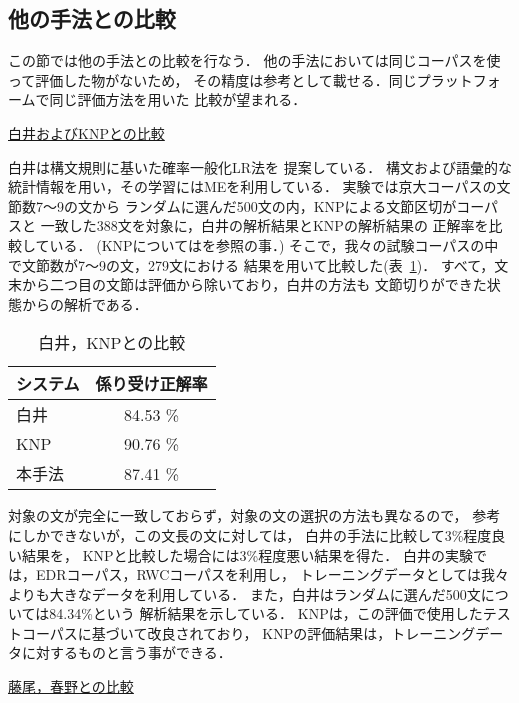 \subsection{他の手法との比較}

この節では他の手法との比較を行なう．
他の手法においては同じコーパスを使って評価した物がないため，
その精度は参考として載せる．同じプラットフォームで同じ評価方法を用いた
比較が望まれる．


\begin{flushleft}
\underline{白井およびKNPとの比較}
\end{flushleft}

白井\cite{shirai:jnlp98:1}は構文規則に基いた確率一般化LR法を
提案している．
構文および語彙的な統計情報を用い，その学習にはMEを利用している．
実験では京大コーパスの文節数7〜9の文から
ランダムに選んだ500文の内，KNPによる文節区切がコーパスと
一致した388文を対象に，白井の解析結果とKNPの解析結果の
正解率を比較している．
(KNPについては\cite{kurohashi:snlr94}を参照の事．)
そこで，我々の試験コーパスの中で文節数が7〜9の文，279文における
結果を用いて比較した(表~\ref{CompShiraiKNP})．
すべて，文末から二つ目の文節は評価から除いており，白井の方法も
文節切りができた状態からの解析である．
\begin{table}[tbh]
\caption{白井，KNPとの比較}
\label{CompShiraiKNP} 
\begin{center}
\begin{tabular}{|l|c|}
\hline
システム    &  係り受け正解率 \\
\hline
白井        &   84.53 \%  \\
KNP         &   90.76 \%  \\
本手法      &   87.41 \%  \\
\hline
\end{tabular}
\end{center}
\end{table}
対象の文が完全に一致しておらず，対象の文の選択の方法も異なるので，
参考にしかできないが，この文長の文に対しては，
白井の手法に比較して3\%程度良い結果を，
KNPと比較した場合には3\%程度悪い結果を得た．
白井の実験では，EDRコーパス，RWCコーパスを利用し，
トレーニングデータとしては我々よりも大きなデータを利用している．
また，白井はランダムに選んだ500文については84.34\%という
解析結果を示している．
KNPは，この評価で使用したテストコーパスに基づいて改良されており，
KNPの評価結果は，トレーニングデータに対するものと言う事ができる．

\begin{flushleft}
\underline{藤尾，春野との比較}
\end{flushleft}

